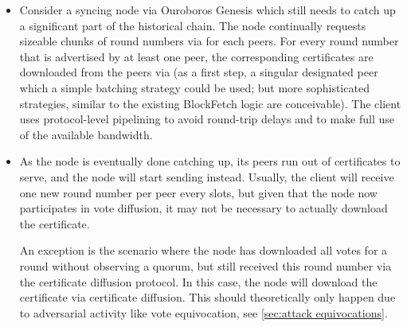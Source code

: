 \begin{itemize}
\item
  Consider a syncing node via Ouroboros Genesis which still needs to catch up a significant part of the historical chain.
  The node continually requests sizeable chunks of round numbers via \MsgRequestObjIdsNB{} for each peers.
  For every round number that is advertised by at least one peer, the corresponding certificates are downloaded from the peers via \MsgRequestObjs{} (as a first step, a singular designated peer which a simple batching strategy could be used; but more sophisticated strategies, similar to the existing BlockFetch logic are conceivable).
  The client uses protocol-level pipelining to avoid round-trip delays and to make full use of the available bandwidth.
\item
  As the node is eventually done catching up, its peers run out of certificates to serve, and the node will start sending \MsgRequestObjIdsB{} instead.
  Usually, the client will receive one new round number per peer every \perasRoundSlots{} slots, but given that the node now participates in vote diffusion, it may not be necessary to actually download the certificate.

  An exception is the scenario where the node has downloaded all votes for a round without observing a quorum, but still received this round number via the certificate diffusion protocol.
  In this case, the node will download the certificate via certificate diffusion.
  This should theoretically only happen due to adversarial activity like vote equivocation, see \cref{sec:attack equivocations}.
\end{itemize}


